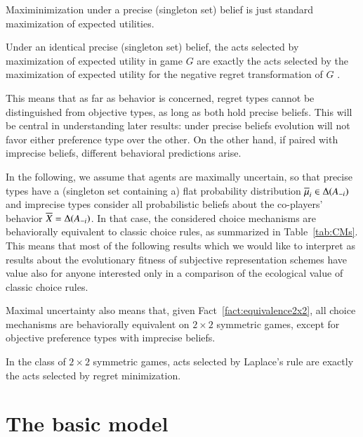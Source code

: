 \documentclass[fleqn,reqno,11pt]{article}
\begin{document}
\begin{fact} \label{fact:singleton probability set}
Maximinimization under a precise (singleton set) belief is just standard
maximization of expected utilities.
\end{fact}

\begin{fact} \label{fact:maxEU-minReg} Under an identical precise (singleton set) belief, the
  acts selected by maximization of expected utility in game $G$ are exactly the acts selected
  by the maximization of expected utility for the negative regret transformation of $G$
  \citep[e.g.,][]{HalpernPass2012:Iterated-Regret}.
\end{fact}

This means that as far as behavior is concerned, regret types cannot be distinguished from
objective types, as long as both hold precise beliefs. This will be central in understanding
later results: under precise beliefs evolution will not favor either preference type over the
other. On the other hand, if paired with imprecise beliefs, different behavioral predictions
arise. 

In the following, we assume that agents are maximally uncertain, so that precise types have a
(singleton set containing a) flat probability distribution
$\overline{\mu}_i \in \Delta(A_{-i})$ and imprecise types consider all probabilistic
beliefs about the co-players' behavior $\overline{X} = \Delta(A_{-i})$. In that case, the
considered choice mechanisms are behaviorally equivalent to classic choice rules, as summarized
in Table~\ref{tab:CMs}. This means that most of the following results which we would like to
interpret as results about the evolutionary fitness of subjective representation schemes have
value also for anyone interested only in a comparison of the ecological value of classic choice
rules.

Maximal uncertainty also means that, given Fact~\ref{fact:equivalence2x2}, all choice
mechanisms are behaviorally equivalent on $2 \times 2$ symmetric games, except for objective
preference types with imprecise beliefs.

\begin{fact} \label{fact:equivalence2x2} In the class of $2 \times 2$ symmetric games, acts
  selected by Laplace's rule are exactly the acts selected by regret minimization. 
\end{fact} 


\section{The basic model}
\label{sec:basic-model-1}
\end{document}
